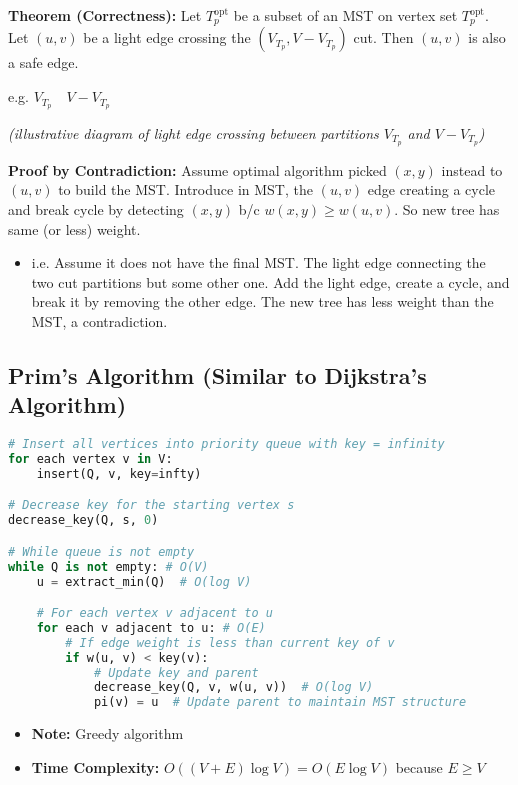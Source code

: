 \begin{derivation}
    \textbf{Theorem (Correctness):} Let \( T_p^{\text{opt}} \) be a subset of an MST on vertex set $T_p^{\text{opt}}$. Let \( (u, v) \) be a light edge crossing the \( (V_{T_p}, V - V_{T_p}) \) cut. Then \( (u, v) \) is also a safe edge.

    \begin{center}
    e.g. \( V_{T_p} \quad V - V_{T_p} \) 
    \end{center}

    \begin{center}
    \textit{(illustrative diagram of light edge crossing between partitions \( V_{T_p} \) and \( V - V_{T_p} \))}
    \end{center}

    \textbf{Proof by Contradiction:} Assume optimal algorithm picked $(x,y)$ instead to $(u,v)$ to build the MST. Introduce in MST, the $(u,v)$ edge creating a cycle and break cycle by detecting $(x,y)$ b/c $w(x,y) \geq w(u,v)$. So new tree has same (or less) weight.
    \begin{itemize}
        \item i.e. Assume it does not have the final MST. The light edge connecting the two cut partitions but some other one. Add the light edge, create a cycle, and break it by removing the other edge. The new tree has less weight than the MST, a contradiction.
    \end{itemize}

\end{derivation}

\subsection{Prim's Algorithm (Similar to Dijkstra's Algorithm)}
\begin{definition}
\begin{lstlisting}[language=Python, caption=Prim's Algorithm]
# Insert all vertices into priority queue with key = infinity
for each vertex v in V:
    insert(Q, v, key=infty)

# Decrease key for the starting vertex s
decrease_key(Q, s, 0)

# While queue is not empty
while Q is not empty: # O(V)
    u = extract_min(Q)  # O(log V)

    # For each vertex v adjacent to u
    for each v adjacent to u: # O(E)
        # If edge weight is less than current key of v
        if w(u, v) < key(v):
            # Update key and parent
            decrease_key(Q, v, w(u, v))  # O(log V)
            pi(v) = u  # Update parent to maintain MST structure
    \end{lstlisting}
    \begin{itemize}
        \item \textbf{Note:} Greedy algorithm 
        \item \textbf{Time Complexity:} \(O((V + E) \log V) = O(E \log V)\) because $E \geq V$
    \end{itemize}
\end{definition}

